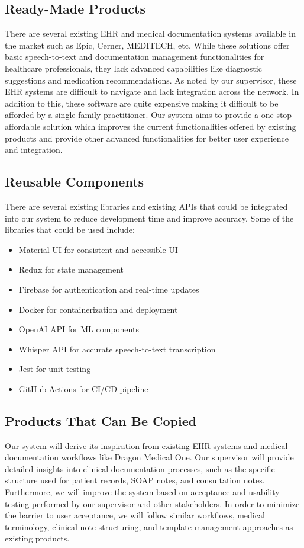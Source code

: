 \documentclass[12pt]{article}
\begin{document}
\subsection{Ready-Made Products}
There are several existing EHR and medical documentation systems available in the market such as Epic, Cerner, MEDITECH, etc. While these solutions offer basic speech-to-text and documentation management functionalities for healthcare professionals, they lack advanced capabilities like diagnostic suggestions and medication recommendations. As noted by our supervisor, these EHR systems are difficult to navigate and lack integration across the network. In addition to this, these software are quite expensive making it difficult to be afforded by a single family practitioner. Our system aims to provide a one-stop affordable solution which improves the current functionalities offered by existing products and provide other advanced functionalities for better user experience and integration.

\subsection{Reusable Components}
There are several existing libraries and existing APIs that could be integrated into our system to reduce development time and improve accuracy. Some of the libraries that could be used include:

\begin{itemize}
  \item Material UI for consistent and accessible UI
  \item Redux for state management
  \item Firebase for authentication and real-time updates
  \item Docker for containerization and deployment
  \item OpenAI API for ML components
  \item Whisper API for accurate speech-to-text transcription
  \item Jest for unit testing
  \item GitHub Actions for CI/CD pipeline 
\end{itemize}

\subsection{Products That Can Be Copied}
Our system will derive its inspiration from existing EHR systems and medical documentation workflows like Dragon Medical One. Our supervisor will provide detailed insights into clinical documentation processes, such as the specific structure used for patient records, SOAP notes, and consultation notes. Furthermore, we will improve the system based on acceptance and usability testing performed by our supervisor and other stakeholders. In order to minimize the barrier to user acceptance, we will follow similar workflows, medical terminology, clinical note structuring, and template management approaches as existing products.
\end{document}
